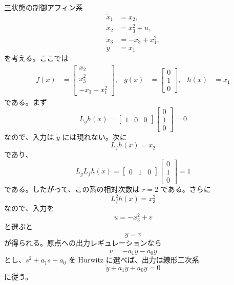 \begin{example}[零ダイナミクスをもつ入出力線形化]
三状態の制御アフィン系
\begin{align}
  \dot{x}_1&=x_2,\\
  \dot{x}_2&=x_3^2+u,\\
  \dot{x}_3&=-x_3+x_1^2,\\
  y&=x_1
\end{align}
を考える。ここでは
\begin{align}
  f(x)&=
  \begin{bmatrix}
    x_2\\
    x_3^2\\
    -x_3+x_1^2
  \end{bmatrix},
  &
  g(x)&=
  \begin{bmatrix}
    0\\
    1\\
    0
  \end{bmatrix},
  &
  h(x)&=x_1
\end{align}
である。まず
\begin{equation}
  L_gh(x)=
  \begin{bmatrix}1&0&0\end{bmatrix}
  \begin{bmatrix}0\\1\\0\end{bmatrix}
  =0
\end{equation}
なので、入力は $\dot{y}$ には現れない。次に
\begin{equation}
  L_fh(x)=x_2
\end{equation}
であり、
\begin{equation}
  L_gL_fh(x)=
  \begin{bmatrix}0&1&0\end{bmatrix}
  \begin{bmatrix}0\\1\\0\end{bmatrix}
  =1
\end{equation}
である。したがって、この系の相対次数は $r=2$ である。さらに
\begin{equation}
  L_f^2h(x)=x_3^2
\end{equation}
なので、入力を
\begin{equation}
  u=-x_3^2+v
\end{equation}
と選ぶと
\begin{equation}
  \ddot{y}=v
\end{equation}
が得られる。原点への出力レギュレーションなら
\begin{equation}
  v=-a_1\dot{y}-a_0y
\end{equation}
とし、$s^2+a_1s+a_0$ を Hurwitz に選べば、出力は線形二次系
\begin{equation}
  \ddot{y}+a_1\dot{y}+a_0y=0
\end{equation}
に従う。


\end{example}
